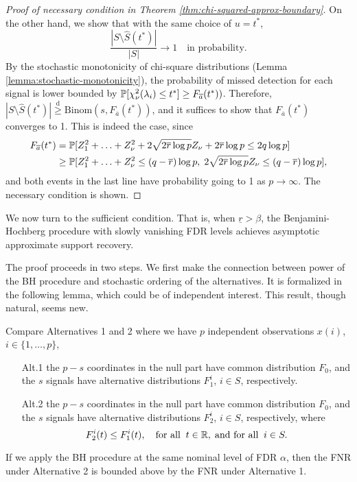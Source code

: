 \begin{proof}[Proof of necessary condition in Theorem \ref{thm:chi-squared-approx-boundary}]
On the other hand, we show that with the same choice of $u = t^*$,
\begin{equation} \label{eq:approx-boundary-proof-converse-4}
    \frac{|{S}\setminus\widehat{S}(t^*)|}{|{S}|}\to 1 \quad \text{in probability}.
\end{equation}
By the stochastic monotonicity of chi-square distributions (Lemma \ref{lemma:stochastic-monotonicity}), the probability of missed detection for each signal is lower bounded by $\P[\chi^2_\nu(\lambda_i) \le t^*] \ge F_{\overline{a}}(t^*))$.
Therefore, $|{S}\setminus\widehat{S}(t^*)| \stackrel{\mathrm{d}}{\ge} \text{Binom}(s, {F_{\overline{a}}}(t^*))$, and it suffices to show that ${F_{\overline{a}}}(t^*)$ converges to 1.
This is indeed the case, since
\begin{align*}
    {F_{\overline{a}}}(t^*) 
    &= \P[Z_1^2 + \ldots + Z_\nu^2 + 2\sqrt{2\overline{r}\log{p}} Z_\nu + 2\overline{r}\log{p} \le 2q\log{p}] \\
    &\ge \P[Z_1^2 + \ldots + Z_\nu^2 \le (q-\overline{r})\log{p}, \; 2\sqrt{2\overline{r}\log{p}} Z_\nu \le (q-\overline{r})\log{p}],
\end{align*}
and both events in the last line have probability going to 1 as $p\to\infty$.
The necessary condition is shown.
\end{proof}

We now turn to the sufficient condition. 
That is, when $\underline{r} > \beta$, the Benjamini-Hochberg procedure with slowly vanishing FDR levels achieves asymptotic approximate support recovery.

The proof proceeds in two steps.
We first make the connection between power of the BH procedure and stochastic ordering of the alternatives.
It is formalized in the following lemma, which could be of independent interest.
This result, though natural, seems new. 

\begin{lemma} \label{lemma:monotonicity-BH-procedure}
Compare Alternatives 1 and 2 where we have $p$ independent observations $x(i)$, $i\in\{1,\ldots,p\}$,
\begin{enumerate}
    \item[Alt.1] the $p-s$ coordinates in the null part have common distribution $F_0$, and the $s$ signals have alternative distributions $F^{i}_1$, $i\in S$, respectively.
    \item[Alt.2] the $p-s$ coordinates in the null part have common distribution $F_0$, and the $s$ signals have alternative distributions $F^{i}_2$, $i\in S$, respectively, where
    $$ F^{i}_2(t) \le F^{i}_1(t), \quad \text{for all} \;\; t\in\R, \; \text{and for all} \;\; i\in S.$$
\end{enumerate}
If we apply the BH procedure at the same nominal level of FDR $\alpha$, then the FNR under Alternative 2 is bounded above by the FNR under Alternative 1.
\end{lemma}

